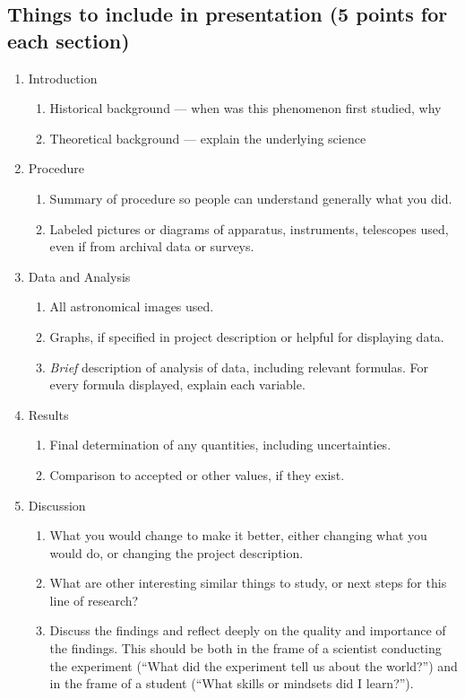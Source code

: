 \subsection{Things to include in presentation (5 points for each section)}
\begin{enumerate}
	\item Introduction
	\begin{enumerate}
		\item Historical background --- when was this phenomenon first studied, why
		\item Theoretical background --- explain the underlying science
	\end{enumerate}
	
	\item Procedure
	\begin{enumerate}
		\item Summary of procedure so people can understand generally what you did.
		\item Labeled pictures or diagrams of apparatus, instruments, telescopes used, even if from archival data or surveys.
	\end{enumerate}
	
	\item Data and Analysis
	\begin{enumerate}
		\item All astronomical images used.
		\item Graphs, if specified in project description or helpful for displaying data.
		\item \textit{Brief} description of analysis of data, including relevant formulas. For every formula displayed, explain each variable.
	\end{enumerate}
	
	\item Results
	\begin{enumerate}
		\item Final determination of any quantities, including uncertainties.
		\item Comparison to accepted or other values, if they exist.
	\end{enumerate}
	
	\item Discussion
	\begin{enumerate}
		\item What you would change to make it better, either changing what you would do, or changing the project description.
		\item What are other interesting similar things to study, or next steps for this line of research?
		\item Discuss the findings and reflect deeply on the quality and importance of the findings. This should be both in the frame of a scientist conducting the experiment (“What did the experiment tell us about the world?”) and in the frame of a student (“What skills or mindsets did I learn?”).
	\end{enumerate}
\end{enumerate}

